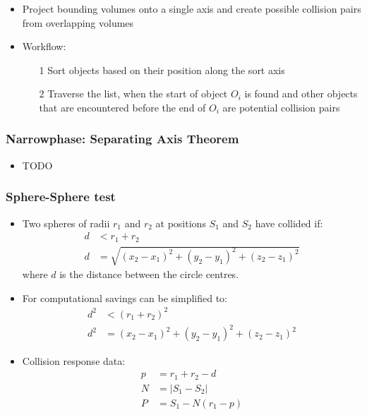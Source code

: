 \documentclass[a4paper]{article}
\begin{document}
\begin{itemize}
  \item
    Project bounding volumes onto a single axis and create possible collision
    pairs from overlapping volumes

  \item
    Workflow:
    \begin{enumerate}
      \item[1]
        Sort objects based on their position along the sort axis

      \item[2]
        Traverse the list, when the start of object $O_{i}$ is found and other
        objects that are encountered before the end of $O_{i}$ are potential
        collision pairs

    \end{enumerate}

\end{itemize}

\subsubsection{Narrowphase: Separating Axis Theorem}

\begin{itemize}
  \item
    TODO

\end{itemize}

\subsubsection{Sphere-Sphere test}

\begin{itemize}
  \item
    Two spheres of radii $r_{1}$ and $r_{2}$ at positions $S_{1}$ and $S_{2}$
    have collided if:
    \begin{align*}
      d &< r_{1} + r_{2} \\
      d &= \sqrt{(x_{2} - x_{1})^{2} + (y_{2} - y_{1})^{2} + (z_{2} - z_{1})^{2}}
    \end{align*}
    where $d$ is the distance between the circle centres.

  \item
    For computational savings can be simplified to:
    \begin{align*}
      d^{2} &< (r_{1} + r_{2})^{2} \\
      d^{2} &= (x_{2} - x_{1})^{2} + (y_{2} - y_{1})^{2} + (z_{2} - z_{1})^{2}
    \end{align*}

  \item
    Collision response data:
    \begin{align*}
      p &= r_{1} + r_{2} - d \\
      N &= |S_{1} - S_{2}| \\
      P &= S_{1} - N(r_{1} - p)
    \end{align*}

\end{itemize}
\end{document}
